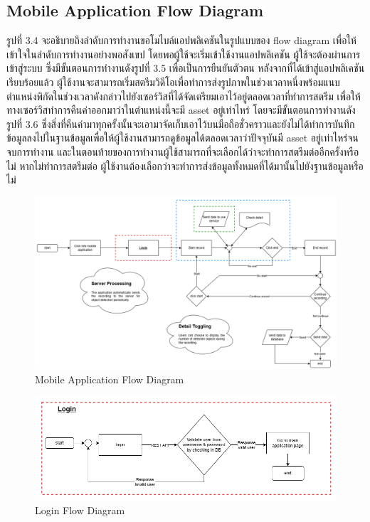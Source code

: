 \newpage
\subsection{Mobile Application Flow Diagram}
รูปที่ 3.4 จะอธิบายถึงลำดับการทำงานขอโมไบล์แอปพลิเคชันในรูปแบบของ flow diagram เพื่อให้เข้าใจในลำดับการทำงานอย่างพอสังเขป โดยพอผู้ใช้จะเริ่มเข้าใช้งานแอปพลิเคชัน 
ผู้ใช้จะต้องผ่านการเข้าสู่ระบบ ซึ่งมีขั้นตอนการทำงานดังรูปที่ 3.5 เพื่อเป็นการยืนยันตัวตน หลังจากที่ได้เข้าสู่แอปพลิเคชันเรียบร้อยแล้ว 
ผู้ใช้งานจะสามารถเริ่มสตรีมวิดีโอเพื่อทำการส่งรูปภาพในช่วงเวลาหนึ่งพร้อมแนบตำแหน่งพิกัดในช่วงเวลาดังกล่าวไปยังเซอร์วิสที่ได้จัดเตรียมเอาไว้อยู่ตลอดเวลาที่ทำการสตรีม 
เพื่อให้ทางเซอร์วิสทำการคืนค่าออกมาว่าในตำแหน่งนี้จะมี asset อยู่เท่าไหร่ โดยจะมีขั้นตอนการทำงานดังรูปที่ 3.6 
ซึ่งสิ่งที่คืนค่ามาทุกครั้งนั้นจะเอามาจัดเก็บเอาไว้บนมือถือชั่วคราวและยังไม่ได้ทำการบันทึกข้อมูลลงไปในฐานข้อมูลเพื่อให้ผู้ใช้งานสามารถดูข้อมูลได้ตลอดเวลาว่าปัจจุบันมี 
asset อยู่เท่าไหร่จนจบการทำงาน และในตอนท้ายของการทำงานผู้ใช้สามารถที่จะเลือกได้ว่าจะทำการสตรีมต่ออีกครั้งหรือไม่ หากไม่ทำการสตรีมต่อ 
ผู้ใช้งานต้องเลือกว่าจะทำการส่งข้อมูลทั้งหมดที่ได้มานั้นไปยังฐานข้อมูลหรือไม่
\begin{figure}[ht]
  \begin{center}
  \includegraphics[scale=0.5]{resources/MobileAppFlow.png}
  \end{center}
  \caption[Mobile Application Flow Diagram]{Mobile Application Flow Diagram}
  \label{fig:mopile-app flow design}
\end{figure}

\begin{figure}[ht]
  \begin{center}
  \includegraphics[scale=0.6]{resources/LoginFlow.png}
  \end{center}
  \caption[Login Flow Diagram]{Login Flow Diagram}
  \label{fig:login flow design}
\end{figure}

